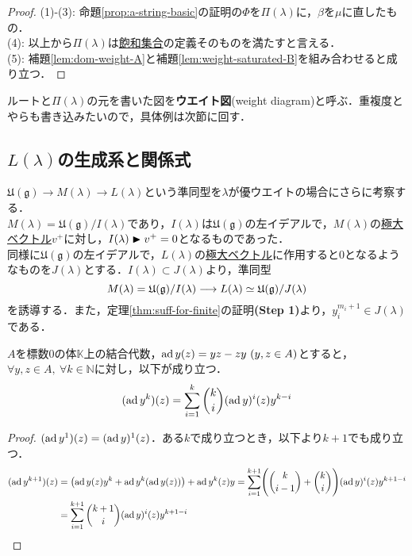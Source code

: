 \documentclass[rep_main]{subfiles}
\begin{document}
\begin{proof}
	(1)-(3): 命題\ref{prop:a-string-basic}の証明の$\Phi$を$\Pi(\lambda)$に，$\beta$を$\mu$に直したもの．\\
	(4): 以上から$\Pi(\lambda)$は\hyperref[def:weight-saturated]{飽和集合}の定義そのものを満たすと言える．\\
	(5): 補題\ref{lem:dom-weight-A}と補題\ref{lem:weight-saturated-B}を組み合わせると成り立つ．
\end{proof}
ルートと$\Pi(\lambda)$の元を書いた図を\textbf{ウエイト図}(weight diagram)と呼ぶ．重複度とやらも書き込みたいので，具体例は次節に回す．

\subsection{$L(\lambda)$の生成系と関係式}
$\mathfrak{U}(\mathfrak{g}) \to M(\lambda) \to L(\lambda)$という準同型を$\lambda$が優ウエイトの場合にさらに考察する．\\
$M(\lambda) = \mathfrak{U}(\mathfrak{g}) / I(\lambda)$であり，$I(\lambda)$は$\mathfrak{U}(\mathfrak{g})$の左イデアルで，$M(\lambda)$の\hyperref[def:maximal-vector-rep]{極大ベクトル}$v^+$に対し，$I(\lambda) \blacktriangleright v^+ = 0$となるものであった．\\
同様に$\mathfrak{U}(\mathfrak{g})$の左イデアルで，$L(\lambda)$の\hyperref[def:maximal-vector-rep]{極大ベクトル}に作用すると$0$となるようなものを$J(\lambda)$とする．$I(\lambda) \subset J(\lambda)$より，準同型
\begin{equation}
	M(\lambda) = \mathfrak{U}(\mathfrak{g}) / I(\lambda) \longrightarrow L(\lambda) \simeq \mathfrak{U}(\mathfrak{g}) / J(\lambda)
\end{equation}
を誘導する．また，定理\ref{thm:suff-for-finite}の証明\textbf{(Step 1)}より，$y_i^{m_i + 1} \in J(\lambda)$である．
\begin{mylem}[label=lem:Lie-bracket-power]{}
	$A$を標数$0$の体$\mathbb{K}$上の結合代数，$\operatorname{ad} y(z) = yz - zy\ (y, z \in A)$とすると，\\
	$\forall y, z \in A,\ \forall k \in \mathbb{N}$に対し，以下が成り立つ．
	\begin{equation}
		(\operatorname{ad} y^k)(z) = \sum_{i=1}^k \binom{k}{i}(\operatorname{ad} y)^i(z)y^{k-i}
	\end{equation}
\end{mylem}
\begin{proof}
	$(\operatorname{ad} y^1)(z) = (\operatorname{ad} y)^1(z)$．ある$k$で成り立つとき，以下より$k+1$でも成り立つ．
	\begin{align}
		(\operatorname{ad} y^{k+1})(z) &= \bigl(\operatorname{ad} y(z)y^k + \operatorname{ad} y^k(\operatorname{ad} y(z))\bigr) + \operatorname{ad} y^k(z)y = \sum_{i=1}^{k+1} \Biggl(\binom{k}{i-1} + \binom{k}{i}\Biggr)(\operatorname{ad} y)^i(z)y^{k+1-i} \\
		&= \sum_{i=1}^{k+1} \binom{k+1}{i}(\operatorname{ad} y)^i(z)y^{k+1-i}
	\end{align}
\end{proof}
\end{document}
